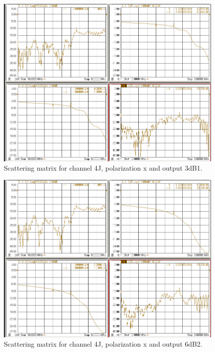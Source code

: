 \documentclass[12pt,a4paper,oneside]{article}
\begin{document}
\begin{figure}[H]
\centering
\includegraphics[width=0.9\linewidth]{VNA_results/4Jx_3dB1.png}
\caption{Scattering matrix for channel 4J, polarization x and output 3dB1.}
\label{fig:4Jx_3dB1}
\end{figure}


\begin{figure}[H]
\centering
\includegraphics[width=0.9\linewidth]{VNA_results/4Jx_6dB2.png}
\caption{Scattering matrix for channel 4J, polarization x and output 6dB2.}
\label{fig:4Jx_6dB2}
\end{figure}
\end{document}
